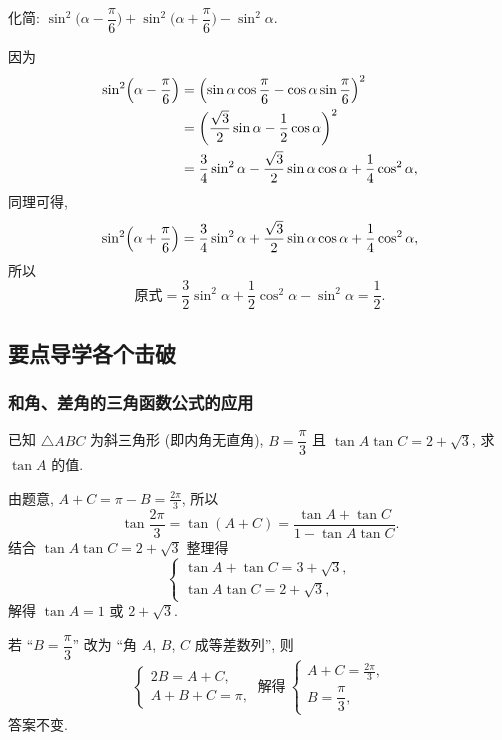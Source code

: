 \begin{exercise}
    化简: $\sin^2\Big(\alpha- \dfrac\pi6\Big) 
      + \sin^2\Big(\alpha+ \dfrac\pi6\Big) -\sin^2 \alpha$.
\end{exercise}
\beginsolution
    因为 
    \[\begin{aligned}
        \sin^2\Bigl(\alpha- \dfrac\pi6\Bigr)
        &= \Bigl(\sin\alpha\cos\dfrac\pi6
            - \cos\alpha\sin\frac\pi6\Bigr)^2\\
        &= \biggl(\frac{\sqrt3}{2}\sin\alpha
            - \frac12\cos\alpha\biggr)^2\\
        &= \frac34\sin^2\alpha- \frac{\sqrt3}{2}\sin\alpha\cos\alpha+ \frac14\cos^2\alpha,
    \end{aligned}\]
    同理可得,
    \[\sin^2\Bigl(\alpha+ \dfrac\pi6\Bigr)
        = \frac34\sin^2\alpha+ \frac{\sqrt3}{2}\sin\alpha\cos\alpha+ \frac14\cos^2\alpha,\]
    所以
    \[\text{原式}= \frac32\sin^2\alpha+ \frac12\cos^2\alpha- \sin^2\alpha= \frac12.\]
\endsolution

\subsection{要点导学\quad 各个击破}
\subsubsection{和角、差角的三角函数公式的应用}

\begin{example}
    已知 $\triangle ABC$ 为斜三角形 (即内角无直角), $B=\dfrac\pi3$ 且 $\tan A\tan C=2+\sqrt3$, 求 $\tan A$ 的值.
\end{example}
\beginsolution
    由题意, $A+C= \pi-B= \frac{2\pi}{3}$, 所以
    \[\tan\frac{2\pi}{3}= \tan(A+C)
        = \frac{\tan A+\tan C}{1-\tan A\tan C}.\]
    结合 $\tan A\tan C=2+\sqrt3$ 整理得
    \[\left\{\!\!\begin{array}{l}
        \tan A+\tan C= 3+\sqrt3,\\
        \tan A\tan C= 2+\sqrt3,
    \end{array}\right.\]
    解得 $\tan A=1$ 或 $2+\sqrt3$.

    \varexercise 若 ``$B=\dfrac\pi3$'' 改为 ``角 $A$, $B$, $C$ 成等差数列'', 则
    \[\left\{\!\!\begin{array}{l}
        2B= A+C,\\
        A+B+C= \pi,
    \end{array}\right.\ \text{解得}\ 
    \left\{\!\!\begin{array}{l}
        A+C= \frac{2\pi}{3},\\
        B=\dfrac\pi3,
    \end{array}\right.\]
    答案不变.

